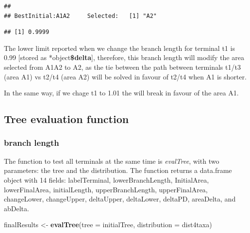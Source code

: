 \documentclass[]{article}
\newenvironment{Shaded}{\begin{snugshade}}{\end{snugshade}}
\newcommand{\DataTypeTok}[1]{\textcolor[rgb]{0.13,0.29,0.53}{#1}}
\newcommand{\KeywordTok}[1]{\textcolor[rgb]{0.13,0.29,0.53}{\textbf{#1}}}
\newcommand{\NormalTok}[1]{#1}
\newcommand{\OperatorTok}[1]{\textcolor[rgb]{0.81,0.36,0.00}{\textbf{#1}}}
\newcommand{\StringTok}[1]{\textcolor[rgb]{0.31,0.60,0.02}{#1}}
\begin{document}
\begin{verbatim}
## 
## BestInitial:A1A2     Selected:   [1] "A2"
\end{verbatim}

\begin{Shaded}
\end{Shaded}

\begin{verbatim}
## [1] 0.9999
\end{verbatim}

The lower limit reported when we change the branch length for terminal
t1 is 0.99 {[}stored as *object\textbf{\$delta}{]}, therefore, this
branch length will modify the area selected from A1A2 to A2, as the tie
between the path between terminals t1/t3 (area A1) vs t2/t4 (area A2)
will be solved in favour of t2/t4 when A1 is shorter.

In the same way, if we chage t1 to 1.01 the will break in favour of the
area A1.

\hypertarget{tree-evaluation-function}{%
\subsection{Tree evaluation function}\label{tree-evaluation-function}}

\hypertarget{branch-length}{%
\subsubsection{branch length}\label{branch-length}}

The function to test all terminals at the same time is \emph{evalTree},
with two parameters: the tree and the distribution. The function returns
a data.frame object with 14 fields: labelTerminal, lowerBranchLength,
InitialArea, lowerFinalArea, initialLength, upperBranchLength,
upperFinalArea, changeLower, changeUpper, deltaUpper, deltaLower,
deltaPD, areaDelta, and abDelta.

\begin{Shaded}
\begin{Highlighting}[]
\NormalTok{finalResults <-}\StringTok{   }\KeywordTok{evalTree}\NormalTok{(}\DataTypeTok{tree =}\NormalTok{ initialTree, }\DataTypeTok{distribution =}\NormalTok{ dist4taxa)}
\end{Highlighting}
\end{Shaded}
\end{document}
